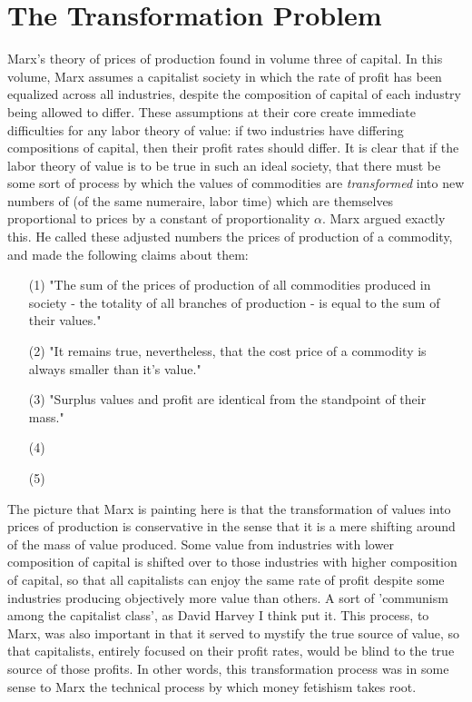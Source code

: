 \documentclass{article}
\theoremstyle{definition}
\theoremstyle{plain}
\theoremstyle{theorem}
\begin{document}
\section{The Transformation Problem}
 Marx's theory of prices of production found in volume three of capital. In this volume, Marx assumes a capitalist society in which the rate of profit has been equalized across all industries, despite the composition of capital of each industry being allowed to differ. These assumptions at their core create immediate difficulties for any labor theory of value: if two industries have differing compositions of capital, then their profit rates should differ. It is clear that if the labor theory of value is to be true in such an ideal society, that there must be some sort of process by which the values of commodities are \emph{transformed} into new numbers of (of the same numeraire, labor time) which are themselves proportional to prices by a constant of proportionality $\alpha$. Marx argued exactly this. He called these adjusted numbers the prices of production of a commodity, and made the following claims about them: 
\begin{itemize}
	\item[(1)] "The sum of the prices of production of all commodities produced in society - the totality of all branches of production - is equal to the sum of their values."
	\item[(2)] "It remains true, nevertheless, that the cost price of a commodity is always smaller than it's value."
	\item[(3)] "Surplus values and profit are identical from the standpoint of their mass."
	\item[(4)]
	\item[(5)]
\end{itemize}
The picture that Marx is painting here is that the transformation of values into prices of production is conservative in the sense that it is a mere shifting around of the mass of value produced. Some value from industries with lower composition of capital is shifted over to those industries with higher composition of capital, so that all capitalists can enjoy the same rate of profit despite some industries producing objectively more value than others. A sort of 'communism among the capitalist class', as David Harvey I think put it. This process, to Marx, was also important in that it served to mystify the true source of value, so that capitalists, entirely focused on their profit rates, would be blind to the true source of those profits. In other words, this transformation process was in some sense to Marx the technical process by which money fetishism takes root. \par
\end{document}
